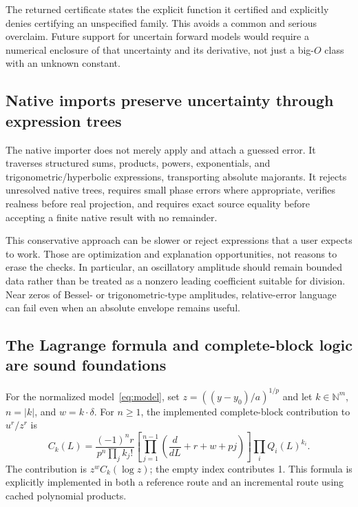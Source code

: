 \documentclass[11pt,a4paper]{article}
\newcommand{\N}{\mathbb N}
\newcommand{\code}[1]{\texttt{\detokenize{#1}}}
\begin{document}
The returned certificate states the explicit function it certified and explicitly denies certifying an unspecified \code{"InputRemainder"} family. This avoids a common and serious overclaim. Future support for uncertain forward models would require a numerical enclosure of that uncertainty and its derivative, not just a big-$O$ class with an unknown constant.\cite{cert}

\subsection{Native imports preserve uncertainty through expression trees}

The native importer does not merely apply \code{Normal} and attach a guessed error. It traverses structured sums, products, powers, exponentials, and trigonometric/hyperbolic expressions, transporting absolute majorants. It rejects unresolved native trees, requires small phase errors where appropriate, verifies realness before real projection, and requires exact source equality before accepting a finite native result with no remainder.\cite{native}

This conservative approach can be slower or reject expressions that a user expects to work. Those are optimization and explanation opportunities, not reasons to erase the checks. In particular, an oscillatory amplitude should remain bounded data rather than be treated as a nonzero leading coefficient suitable for division. Near zeros of Bessel- or trigonometric-type amplitudes, relative-error language can fail even when an absolute envelope remains useful.

\subsection{The Lagrange formula and complete-block logic are sound foundations}

For the normalized model~\eqref{eq:model}, set $z=((y-y_0)/a)^{1/p}$ and let $k\in\N^m$, $n=|k|$, and $w=k\cdot\delta$. For $n\ge1$, the implemented complete-block contribution to $u^r/z^r$ is
\begin{equation}\label{eq:euler}
 C_k(L)=\frac{(-1)^n r}{p^n\prod_j k_j!}
 \left[\prod_{j=1}^{n-1}\left(\frac{d}{dL}+r+w+pj\right)\right]
 \prod_i Q_i(L)^{k_i}.
\end{equation}
The contribution is $z^w C_k(\log z)$; the empty index contributes 1. This formula is explicitly implemented in both a reference route and an incremental route using cached polynomial products.\cite{core,incremental}
\end{document}
